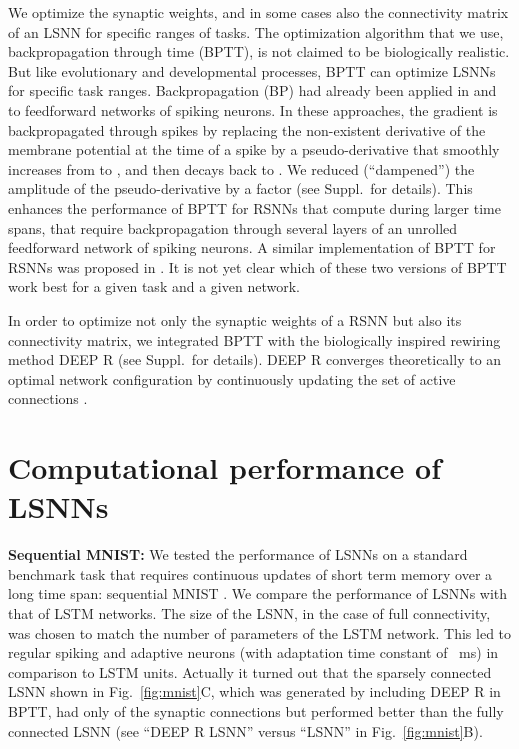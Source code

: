 \documentclass{article} \pdfoutput=1
\begin{document}
We optimize the synaptic weights, and in some cases also the connectivity matrix of an LSNN for specific ranges of tasks. 
The optimization algorithm that we use, backpropagation through time (BPTT), is not claimed to be biologically realistic. But like evolutionary and developmental processes, BPTT can optimize LSNNs for specific task ranges.
Backpropagation (BP) had already been
applied in \cite{courbariaux_binarized_2016} and \cite{esser_convolutional_2016} to feedforward networks of spiking
neurons. In these approaches, the gradient is backpropagated
through spikes by replacing the non-existent derivative of the membrane potential at the time of a
spike by a pseudo-derivative that smoothly increases from  to , and then decays back to .
We reduced (``dampened'') the amplitude of the pseudo-derivative by a factor   (see Suppl.~for details).
This enhances the performance of BPTT for RSNNs that compute during larger time spans,
that require backpropagation through several  layers of an unrolled feedforward network of spiking neurons.
A similar implementation of BPTT for RSNNs was proposed in \cite{huh2017gradient}.
It is not yet clear which of these two versions of BPTT work best for a given task and a given network.

In order to optimize not only the synaptic weights of a RSNN but also its connectivity matrix, we integrated BPTT with the biologically inspired \cite{kappel2017reward} rewiring method DEEP R \cite{deepr}  (see Suppl.~for details). DEEP R converges theoretically to an optimal network configuration by continuously updating the set of active connections \cite{kappel_network_2015,kappel2017reward,deepr}.





\section{Computational performance of LSNNs}\label{sec:comp_cap}


\textbf{Sequential MNIST:}
We tested the performance of LSNNs on a standard benchmark task that requires continuous updates of short term memory over a long time span: sequential MNIST \cite{LeJH15, costa2017cortical}.
We compare the performance of LSNNs with that of LSTM networks.
The size of the LSNN, in the case of full connectivity, was chosen to match the number of parameters of the LSTM network.
This led to  regular spiking and  adaptive neurons (with adaptation time constant  of ~ms) in comparison to  LSTM units.
Actually it turned out that the sparsely connected LSNN shown in Fig.~\ref{fig:mnist}C,
which was generated by including DEEP R in BPTT, had only  of the synaptic connections but performed better than the fully connected LSNN (see ``DEEP R LSNN'' versus ``LSNN'' in Fig.~\ref{fig:mnist}B).
\end{document}
